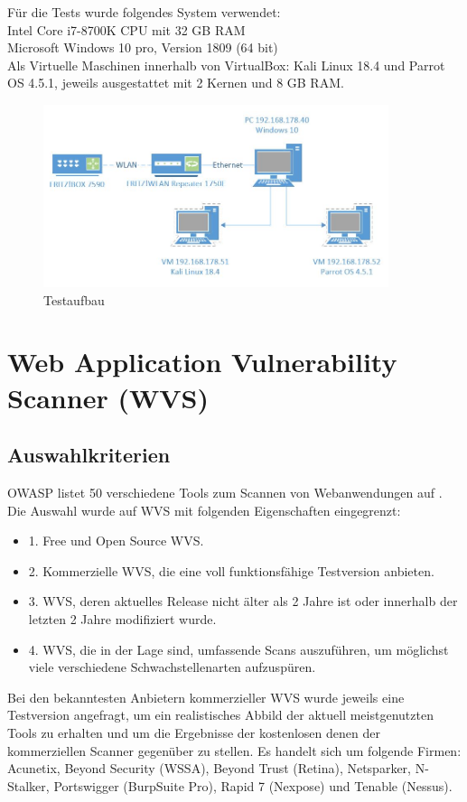 \documentclass[12pt,oneside,a4paper,parskip]{scrbook}
\begin{document}
  Für die Tests wurde folgendes System verwendet:
  \\Intel Core i7-8700K CPU mit 32 GB RAM
  \\Microsoft Windows 10 pro, Version 1809 (64 bit)
  \\Als Virtuelle Maschinen innerhalb von VirtualBox: Kali Linux 18.4 und Parrot OS 4.5.1, jeweils ausgestattet mit 2 Kernen und 8 GB RAM.
  \begin{figure}[H]
    \centering
    \includegraphics[width=0.9\textwidth]{Images/Visio}
    \caption[Testaufbau]{Testaufbau}
  \end{figure}
\section{Web Application Vulnerability Scanner (WVS)}
  \subsection{Auswahlkriterien}
  OWASP listet 50 verschiedene Tools zum Scannen von Webanwendungen auf
  \cite{OWASPtools}. Die Auswahl wurde auf WVS mit folgenden Eigenschaften eingegrenzt:
  \begin{itemize}
    \item 1. Free und Open Source WVS.
    \item 2. Kommerzielle WVS, die eine voll funktionsfähige Testversion anbieten.
    \item 3. WVS, deren aktuelles Release nicht älter als 2 Jahre ist oder innerhalb der letzten 2 Jahre modifiziert wurde.
    \item 4. WVS, die in der Lage sind, umfassende Scans auszuführen, um möglichst viele verschiedene Schwachstellenarten aufzuspüren.
  \end{itemize}
  Bei den bekanntesten Anbietern kommerzieller WVS wurde jeweils eine Testversion angefragt, um ein realistisches Abbild der aktuell meistgenutzten Tools zu erhalten und um die Ergebnisse der kostenlosen denen der kommerziellen Scanner gegenüber zu stellen. Es handelt sich um folgende Firmen:
  \\Acunetix, Beyond Security (WSSA), Beyond Trust (Retina), Netsparker, N-Stalker, Portswigger (BurpSuite Pro), Rapid 7 (Nexpose) und Tenable (Nessus).
\end{document}
